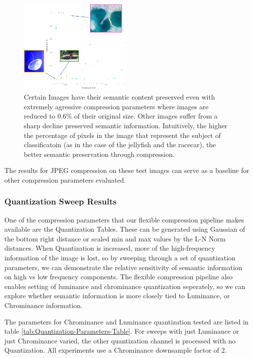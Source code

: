 \begin{figure}
    \includegraphics[width=0.5\textwidth]{assets/JPEG Baseline Compression with Examples}
    \caption{Certain Images have their semantic content preserved even with extremely agressive compression parameters where images are reduced to 0.6\% of their original size. Other images suffer from a sharp decline preserved semantic information. Intuitively, the higher the percentage of pixels in the image that represent the subject of classificatoin (as in the case of the jellyfish and the racecar), the better semantic preservation through compression.}
    \label{fig:Annotated JPEG Baseline}
\end{figure}

The results for JPEG compression on these test images can serve as a baseline for other compression parameters evaluated.

\subsubsection{Quantization Sweep Results}

One of the compression parameters that our flexible compression pipeline makes available are the Quantization Tables.
These can be generated using Gaussian of the bottom right distance or scaled min and max values by the L-N Norm distances.
When Quantization is increased, more of the high-frequency information of the image is lost, so by sweeping through a set of quantization parameters, we can demonstrate the relative sensitivity of semantic information on high vs low frequency components.
The flexible compression pipeline also enables setting of luminance and chrominance quantization seperately, so we can explore whether semantic information is more closely tied to Luminance, or Chrominance information.

The parameters for Chrominance and Luminance quantization tested are listed in table \ref{tab:Quantization-Parameters-Table}. For sweeps with just Luminance or just Chrominance varied, the other quantization channel is processed with no Quantization.
All experiments use a Chrominance downsample factor of 2.

